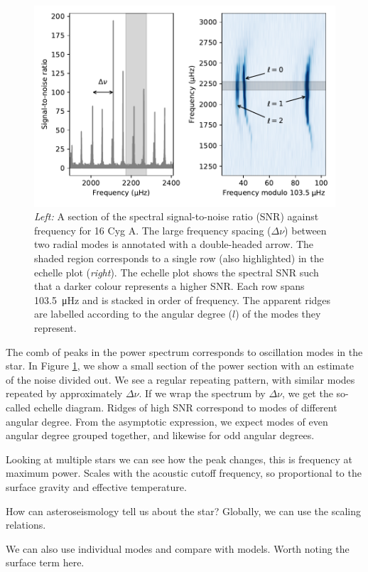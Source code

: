 \begin{figure}[tb]
    \centering
    \includegraphics{figures/seismo-echelle.pdf}
    \caption{\emph{Left:} A section of the spectral signal-to-noise ratio (SNR) against frequency for 16 Cyg A. The large frequency spacing (\(\Delta\nu\)) between two radial modes is annotated with a double-headed arrow. The shaded region corresponds to a single row (also highlighted) in the echelle plot (\emph{right}). The echelle plot shows the spectral SNR such that a darker colour represents a higher SNR. Each row spans \SI{103.5}{\micro\hertz} and is stacked in order of frequency. The apparent ridges are labelled according to the angular degree (\(l\)) of the modes they represent.}
    \label{fig:seismo-echelle}
\end{figure}

The comb of peaks in the power spectrum corresponds to oscillation modes in the star. In Figure \ref{fig:seismo-echelle}, we show a small section of the power section with an estimate of the noise divided out. We see a regular repeating pattern, with similar modes repeated by approximately \(\Delta\nu\). If we wrap the spectrum by \(\Delta\nu\), we get the so-called echelle diagram. Ridges of high SNR correspond to modes of different angular degree. From the asymptotic expression, we expect modes of even angular degree grouped together, and likewise for odd angular degrees.

Looking at multiple stars we can see how the peak changes, this is frequency at maximum power. Scales with the acoustic cutoff frequency, so proportional to the surface gravity and effective temperature.

How can asteroseismology tell us about the star? Globally, we can use the scaling relations.

We can also use individual modes and compare with models. Worth noting the surface term here.
